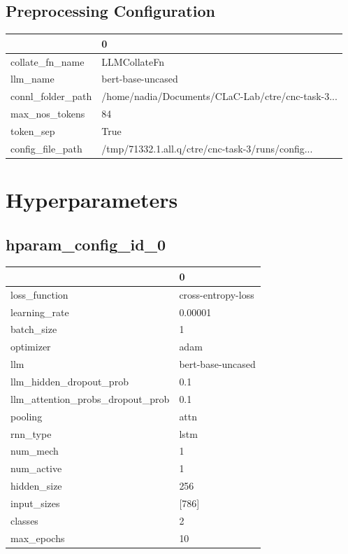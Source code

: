 \documentclass{article}
\begin{document}
\subsection{Preprocessing Configuration}
\begin{tabular}{ll}
\toprule
{} &                                                  0 \\
\midrule
collate\_fn\_name   &                                       LLMCollateFn \\
llm\_name          &                                  bert-base-uncased \\
connl\_folder\_path &  /home/nadia/Documents/CLaC-Lab/ctre/cnc-task-3... \\
max\_nos\_tokens    &                                                 84 \\
token\_sep         &                                               True \\
config\_file\_path  &  /tmp/71332.1.all.q/ctre/cnc-task-3/runs/config... \\
\bottomrule
\end{tabular}

\section{Hyperparameters}
\subsection{hparam\_config\_id\_0}
\begin{tabular}{ll}
\toprule
{} &                   0 \\
\midrule
loss\_function                    &  cross-entropy-loss \\
learning\_rate                    &             0.00001 \\
batch\_size                       &                   1 \\
optimizer                        &                adam \\
llm                              &   bert-base-uncased \\
llm\_hidden\_dropout\_prob          &                 0.1 \\
llm\_attention\_probs\_dropout\_prob &                 0.1 \\
pooling                          &                attn \\
rnn\_type                         &                lstm \\
num\_mech                         &                   1 \\
num\_active                       &                   1 \\
hidden\_size                      &                 256 \\
input\_sizes                      &               [786] \\
classes                          &                   2 \\
max\_epochs                       &                  10 \\
\bottomrule
\end{tabular}
\end{document}
